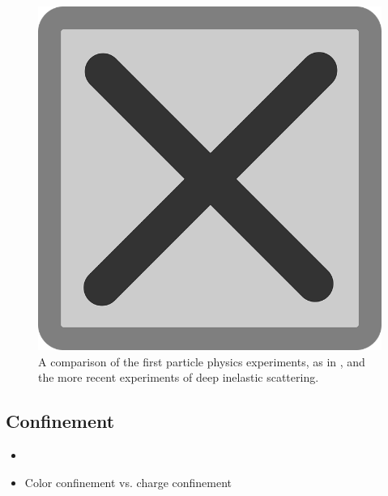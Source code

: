 \begin{figure}[t!]
    \centering
    \includegraphics[width=\textwidth]{figures/tempfig}

    \caption{
        A comparison of the first particle physics experiments, as in , and the more recent experiments of deep inelastic scattering.
    }

    \label{fig:label}
\end{figure}



\subsection{Confinement}


\begin{itemize}
    \item
    \item
        Color confinement vs. charge confinement
\end{itemize}

